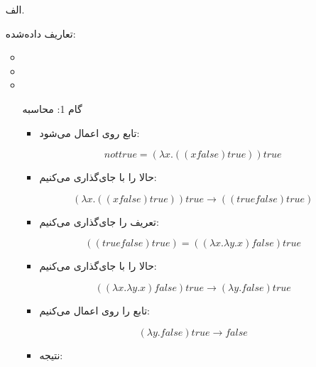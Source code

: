 \documentclass[11pt, a4paper, oneside]{article}
\begin{document}
		\begin{itemize}
			
			\item[الف.]  \par
			تعاریف داده‌شده:
			\begin{itemize}
				
				\item {}
				 
				\item {}
				
				\item {}
				
			\end{itemize}
			
			\begin{itemize}
				
				\item[گام 1:] محاسبه 
				
					\begin{itemize}
						
						\item تابع  روی  اعمال می‌شود:
						
						\[
						not true=(\lambda x.((x false)true))true
						\]
						
						\item حالا  را با  جای‌گذاری می‌کنیم:
						
						\[
						(\lambda x.((x false)true))true \rightarrow ((true false)true)
						\]
						
						\item تعریف  را جای‌گذاری می‌کنیم:
						
						\[
						((true false)true)=((\lambda x.\lambda y.x)false)true
						\]
						
						\item حالا  را با  جای‌گذاری می‌کنیم:
						
						\[
						((\lambda x.\lambda y.x)false)true \rightarrow (\lambda y.false)true
						\]
						
						\item تابع  را روی  اعمال می‌کنیم:
						
						\[
						(\lambda y.false)true \rightarrow false
						\]
						
						\item نتیجه:
						

\end{itemize}
\end{itemize}
\end{itemize}
\end{document}
